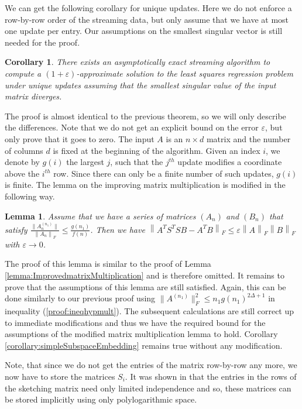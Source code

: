 \documentclass[a4paper,11pt,oneside,english,onecolumn]{article}
\newtheorem{lemma}[theorem]{Lemma}
\newtheorem{corollary}[theorem]{Corollary}
\theoremstyle{definition}
\newcommand{\normF}[1]{\ensuremath{\left\| #1\right\|_F}}
\newcommand{\eps}{\ensuremath{\varepsilon}}
\begin{document}
We can get the following corollary for unique updates. Here we do not enforce a row-by-row order of the streaming data, but only assume that we have at most one update per entry. Our assumptions on the smallest singular vector is still needed for the proof.

\begin{corollary}
There exists an asymptotically exact streaming algorithm to compute a $(1 + \eps)$-approximate solution to the least squares regression problem under unique updates assuming that the smallest singular value of the input matrix diverges.
\end{corollary}

The proof is almost identical to the previous theorem, so we will only describe the differences. Note that we do not get an explicit bound on the error $\eps$, but only prove that it goes to zero. The input $A$ is an $n \times d$ matrix and the number of columns $d$ is fixed at the beginning of the algorithm. Given an index $i$, we denote by $g(i)$ the largest $j$, such that the $j^{th}$ update modifies a coordinate above the $i^{th}$ row. Since there can only be a finite number of such updates, $g(i)$ is finite.
The lemma on the improving matrix multiplication is modified in the following way.
\begin{lemma}
Assume that we have a series of matrices $(A_n)$ and $(B_n)$ that satisfy
$\frac{\|A_n^{(n_1)}\|}{\normF{A_n}} \leq \frac{g(n_1)}{f(n)}$.
Then we have $\normF{A^T S^T S B - A^T B } \leq \eps \normF{A} \normF{B}$
with $\eps \rightarrow 0$.
\end{lemma}
The proof of this lemma is similar to the proof of Lemma \ref{lemma:ImprovedmatrixMultiplication} and is therefore omitted. It remains to prove that the assumptions of this lemma are still satisfied. Again, this can be done similarly to our previous proof using $\|A^{(n_1)}\|_F^2 \leq n_1 g(n_1)^{2 \Delta + 1}$ in inequality (\ref{proof:ineqhypmult}). The subsequent calculations are still correct up to immediate modifications and thus we have the required bound for the assumptions of the modified matrix multiplication lemma to hold. Corollary \ref{corollary:simpleSubspaceEmbedding} remains true without any modification.

Note, that since we do not get the entries of the matrix row-by-row any more, we now have to store the matrices $S_i$. It was shown in \cite{LinAlgStream} that the entries in the rows of the sketching matrix need only limited independence and so, these matrices can be stored implicitly using only polylogarithmic space.
\end{document}
